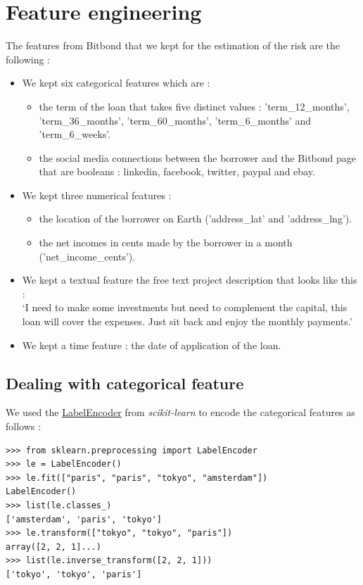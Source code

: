 \section{Feature engineering}
\label{sec:feature_engi}
	The features from Bitbond that we kept for the estimation of the risk are the following :
	\begin{itemize}[font=\footnotesize]
		\item We kept six categorical features which are :
		\begin{itemize}[font=\footnotesize]
			\item the term of the loan that takes five distinct values : 'term\_12\_months', 'term\_36\_months', 'term\_60\_months', 'term\_6\_months' and 'term\_6\_weeks'.
			\item the social media connections between the borrower and the Bitbond page that are booleans : linkedin, facebook, twitter, paypal and ebay.
		\end{itemize}
		\item We kept three numerical features :
		\begin{itemize}
			\item the location of the borrower on Earth ('address\_lat' and 'address\_lng').
			\item the net incomes in cents made by the borrower in a month ('net\_income\_cents').
		\end{itemize}
		\item We kept a textual feature the free text project description that looks like this :\\
		`I need to make some investments but need to complement the capital, this loan will cover the expenses. Just sit back and enjoy the monthly payments.'
		\item We kept a time feature : the date of application of the loan.
	\end{itemize}

	\subsection{Dealing with categorical feature}
		We used the \href{http://scikit-learn.org/stable/modules/generated/sklearn.preprocessing.LabelEncoder.html}{LabelEncoder} from \textit{scikit-learn} to encode the categorical features as follows :
		\begin{verbatim}
>>> from sklearn.preprocessing import LabelEncoder
>>> le = LabelEncoder()
>>> le.fit(["paris", "paris", "tokyo", "amsterdam"])
LabelEncoder()
>>> list(le.classes_)
['amsterdam', 'paris', 'tokyo']
>>> le.transform(["tokyo", "tokyo", "paris"])
array([2, 2, 1]...)
>>> list(le.inverse_transform([2, 2, 1]))
['tokyo', 'tokyo', 'paris']
		\end{verbatim}

